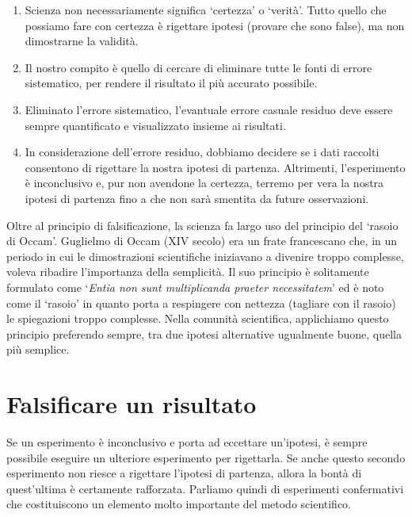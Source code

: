 \documentclass[a4paper,12pt,oneside]{book}
\providecommand{\tightlist}{%
  \setlength{\itemsep}{0pt}\setlength{\parskip}{0pt}}
\begin{document}
\begin{enumerate}
\def\labelenumi{\arabic{enumi}.}
\tightlist
\item
  Scienza non necessariamente significa `certezza' o `verità'. Tutto quello che possiamo fare con certezza è rigettare ipotesi (provare che sono false), ma non dimostrarne la validità.
\item
  Il nostro compito è quello di cercare di eliminare tutte le fonti di errore sistematico, per rendere il risultato il più accurato possibile.
\item
  Eliminato l'errore sistematico, l'evantuale errore casuale residuo deve essere sempre quantificato e visualizzato insieme ai risultati.
\item
  In considerazione dell'errore residuo, dobbiamo decidere se i dati raccolti consentono di rigettare la nostra ipotesi di partenza. Altrimenti, l'esperimento è inconclusivo e, pur non avendone la certezza, terremo per vera la nostra ipotesi di partenza fino a che non sarà smentita da future osservazioni.
\end{enumerate}

Oltre al principio di falsificazione, la scienza fa largo uso del principio del `rasoio di Occam'. Guglielmo di Occam (XIV secolo) era un frate francescano che, in un periodo in cui le dimostrazioni scientifiche iniziavano a divenire troppo complesse, voleva ribadire l'importanza della semplicità. Il suo principio è solitamente formulato come `\emph{Entia non sunt multiplicanda praeter necessitatem}' ed è noto come il `rasoio' in quanto porta a respingere con nettezza (tagliare con il rasoio) le spiegazioni troppo complesse. Nella comunità scientifica, applichiamo questo principio preferendo sempre, tra due ipotesi alternative ugualmente buone, quella più semplice.

\hypertarget{falsificare-un-risultato}{%
\section{Falsificare un risultato}\label{falsificare-un-risultato}}

Se un esperimento è inconclusivo e porta ad eccettare un'ipotesi, è sempre possibile eseguire un ulteriore esperimento per rigettarla. Se anche questo secondo esperimento non riesce a rigettare l'ipotesi di partenza, allora la bontà di quest'ultima è certamente rafforzata. Parliamo quindi di esperimenti confermativi che costituiscono un elemento molto importante del metodo scientifico.
\end{document}
